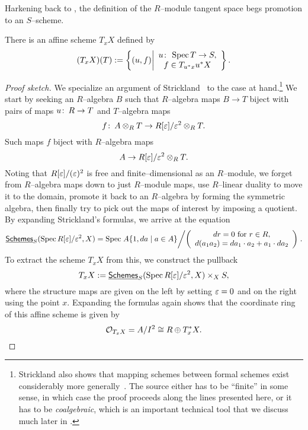Harkening back to , the definition of the $R$--module tangent space begs promotion to an $S$--scheme.
\begin{lemma}
There is an affine scheme $T_x X$ defined by \[(T_x X)(T) := \left\{ (u, f) \middle| \begin{array}{c} u\colon\thinspace \operatorname{Spec} T \to S, \\ f \in T_{u^* x} u^* X \end{array} \right\}.\]
\end{lemma}
\begin{proof}[Proof sketch]
We specialize an argument of Strickland~\cite[Proposition 2.94]{StricklandFSFG} to the case at hand.\footnote{Strickland also shows that mapping schemes between formal schemes exist considerably more generally~\cite[Theorem 4.69]{StricklandFSFG}.  The source either has to be ``finite'' in some sense, in which case the proof proceeds along the lines presented here, or it has to be \textit{coalgebraic}, which is an important technical tool that we discuss much later in .}  We start by seeking an $R$--algebra $B$ such that $R$--algebra maps $B \to T$ biject with pairs of maps $u\colon\thinspace R \to T$ and $T$--algebra maps \[f\colon\thinspace A \otimes_R T \to R[\varepsilon] / \varepsilon^2 \otimes_R T.\]  Such maps $f$ biject with $R$--algebra maps \[A \to R[\varepsilon] / \varepsilon^2 \otimes_R T.\]  Noting that $R[\varepsilon] / (\varepsilon)^2$ is free and finite--dimensional as an $R$--module, we forget from $R$--algebra maps down to just $R$--module maps, use $R$--linear duality to move it to the domain, promote it back to an $R$--algebra by forming the symmetric algebra, then finally try to pick out the maps of interest by imposing a quotient.  By expanding Strickland's formulas, we arrive at the equation \[\operatorname{\underline{\smash{\mathsf{Schemes}}}}_S(\operatorname{Spec} R[\varepsilon] / \varepsilon^2, X) = \operatorname{Spec} \left. A\{1, da \mid a \in A\} \middle/ \left( \begin{array}{c} \text{$dr = 0$ for $r \in R$}, \\ d(a_1 a_2) = da_1 \cdot a_2 + a_1 \cdot da_2 \end{array} \right) \right. .\]  To extract the scheme $T_x X$ from this, we construct the pullback \[T_x X := \operatorname{\underline{\smash{\mathsf{Schemes}}}}_S(\operatorname{Spec} R[\varepsilon] / \varepsilon^2, X) \times_X S,\] where the structure maps are given on the left by setting $\varepsilon = 0$ and on the right using the point $x$.  Expanding the formulas again shows that the coordinate ring of this affine scheme is given by \[\mathcal{O}_{T_x X} = A / I^2 \cong R \oplus T^*_x X. \qedhere\]
\end{proof}

